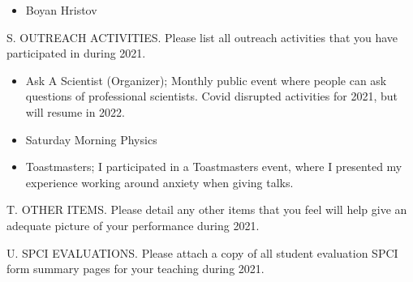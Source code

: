 \begin{itemize}
    \item Boyan Hristov
\end{itemize}


\noindent S. OUTREACH ACTIVITIES. Please list all outreach
activities that you have participated in during 2021.
\bigskip

\begin{itemize}
    \item Ask A Scientist (Organizer); Monthly public event where people can ask questions
        of professional scientists.  Covid disrupted activities for 2021, but
        will resume in 2022.
    \item Saturday Morning Physics
    \item Toastmasters; I participated in a Toastmasters event, where I
        presented my experience working around anxiety when giving talks.
\end{itemize}

\noindent T. OTHER ITEMS. Please detail any other items that you
feel will help give an adequate picture of your performance during
2021.
\bigskip

\noindent U.  SPCI EVALUATIONS. Please attach a copy of all student
evaluation SPCI form summary pages for your teaching during 2021.





 
